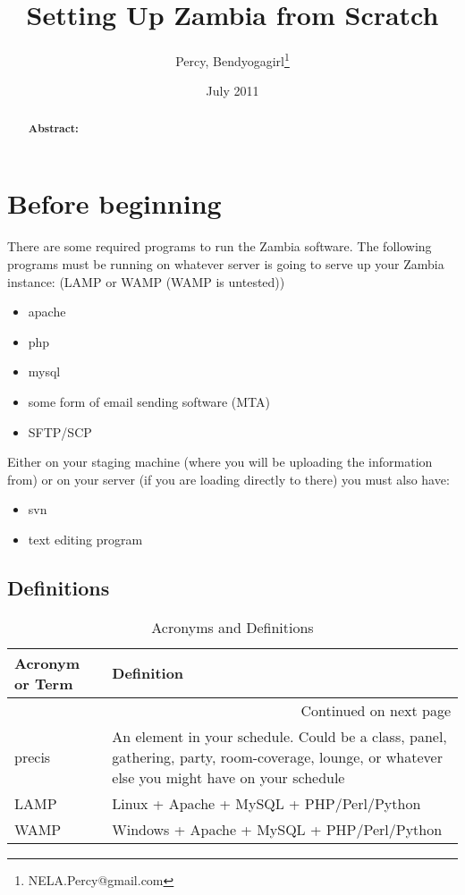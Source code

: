 \documentclass[captions=tablesignature]{scrartcl}
\author{Percy, Bendyogagirl\thanks{NELA.Percy@gmail.com}}
\date{July 2011}
\title{Setting Up Zambia from Scratch}
\begin{document}
\maketitle
{}
\thispagestyle{fancy}
\renewcommand{\headrulewidth}{0pt}
\renewcommand{\footrulewidth}{0pt}
\lhead{}
\rhead{}
\chead{}
\lfoot{}
\cfoot{}
\rfoot{}
\begin{abstract}
\vspace{5cm}
{\LARGE{\textbf{Abstract:\\}}}

\end{abstract}
\newpage
\renewcommand{\headrulewidth}{1pt}
\renewcommand{\footrulewidth}{1pt}
\rfoot{\thepage}
\setcounter{tocdepth}{3}
\tableofcontents
\listoftables
\listoffigures
\newpage
{}
\section{Before beginning}
\label{sec-1}

There are some required programs to run the Zambia software.  The
following programs must be running on whatever server is going to
serve up your Zambia instance: (LAMP or WAMP (WAMP is untested))
\begin{itemize}
\item apache
\item php
\item mysql
\item some form of email sending software (MTA)
\item SFTP/SCP
\end{itemize}

Either on your staging machine (where you will be uploading the
information from) or on your server (if you are loading directly to
there) you must also have:
\begin{itemize}
\item svn
\item text editing program
\end{itemize}
\subsection{Definitions}
\label{sec-1-1}
\begin{longtable}{|p{3.5cm}|p{13.4cm}|}
\caption{\label{tbl:acronymsdefinitions}Acronyms and Definitions}
\\
\hline
Acronym or Term & Definition\\
\hline
\endhead
\hline\multicolumn{2}{r}{Continued on next page} \\
\endfoot
\endlastfoot
precis & An element in your schedule.  Could be a class, panel, gathering, party, room-coverage, lounge, or whatever else you might have on your schedule\\
LAMP & Linux + Apache + MySQL + PHP/Perl/Python\\
WAMP & Windows + Apache + MySQL + PHP/Perl/Python\\
\hline
\end{longtable}
\end{document}
